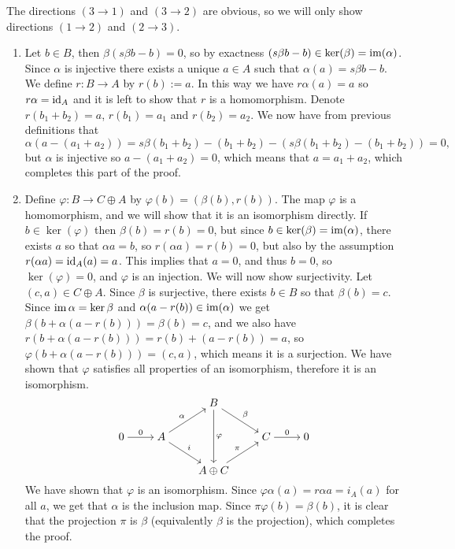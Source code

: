 \documentclass[11pt,a4paper]{article}
\begin{document}
\begin{solution}
  The directions $(3 \to 1)$ and $(3 \to 2)$ are obvious,
  so we will only show directions $(1 \to 2)$ and $(2 \to 3)$.
  \begin{enumerate}
    \item[$(1 \to 2)$] Let $b \in B$, then $\beta(s\beta b - b) = 0$,
      so by exactness $(s\beta b - b) \in \ker(\beta) = \operatorname{im}(\alpha)$.
      Since $\alpha$ is injective there exists a unique $a \in A$
      such that $\alpha(a) = s\beta b - b$.
      We define $r \colon B \to A$ by $r(b) := a$.
      In this way we have $r\alpha(a) = a$ so $r\alpha = \operatorname{id}_A$
      and it is left to show that $r$ is a homomorphism.
      Denote $r(b_1 + b_2) = a$, $r(b_1) = a_1$ and $r(b_2) = a_2$.
      We now have from previous definitions that
      \[
        \alpha(a - (a_1 + a_2)) =
        s\beta (b_1 + b_2) - (b_1 + b_2) -
        (s\beta (b_1 + b_2) - (b_1 + b_2)) = 0,
      \]
      but $\alpha$ is injective so $a - (a_1 + a_2) = 0$,
      which means that $a = a_1 + a_2$, which completes this part of the proof.
    \item[$(2 \to 3)$] Define $\varphi \colon B \to C \oplus A$ by
      $\varphi(b) = (\beta(b),r(b))$.
      The map $\varphi$ is a homomorphism, and we will show that it is
      an isomorphism directly.
      If $b \in \ker(\varphi)$ then $\beta(b) = r(b) = 0$,
      but since $b \in \ker(\beta) = \operatorname{im}(\alpha)$,
      there exists $a$ so that $\alpha a = b$,
      so $r(\alpha a) = r(b) = 0$,
      but also by the assumption $r(\alpha a) = \operatorname{id}_A(a) = a$.
      This implies that $a = 0$, and thus $b = 0$,
      so $\ker(\varphi) = 0$, and $\varphi$ is an injection.
      We will now show surjectivity.
      Let $(c,a) \in C \oplus A$.
      Since $\beta$ is surjective, there exists $b \in B$ so that
      $\beta(b) = c$.
      Since $\operatorname{im} \alpha = \ker \beta$
      and $\alpha(a - r(b)) \in \operatorname{im}(\alpha)$
      we get $\beta(b + \alpha(a - r(b))) = \beta(b) = c$,
      and we also have
      $r(b + \alpha(a - r(b))) = r(b) + (a - r(b)) = a$,
      so $\varphi(b + \alpha(a - r(b))) = (c,a)$,
      which means it is a surjection.
      We have shown that $\varphi$ satisfies all properties of an isomorphism,
      therefore it is an isomorphism.
      \[\begin{tikzcd}[ampersand replacement=\&,cramped]
      \&\& B \\
      0 \& A \&\& C \& 0 \\
      \&\& {A \oplus C}
      \arrow["\beta", from=1-3, to=2-4]
      \arrow["\varphi", from=1-3, to=3-3]
      \arrow["0", from=2-1, to=2-2]
      \arrow["\alpha", from=2-2, to=1-3]
      \arrow["i", from=2-2, to=3-3]
      \arrow["0", from=2-4, to=2-5]
      \arrow["\pi", from=3-3, to=2-4]
    \end{tikzcd}\]
    We have shown that $\varphi$ is an isomorphism.
    Since $\varphi \alpha(a) = r \alpha a = i_A(a)$ for all $a$,
    we get that $\alpha$ is the inclusion map.
    Since $\pi \varphi(b) = \beta(b)$, it is clear that the projection $\pi$
    is $\beta$ (equivalently $\beta$ is the projection),
    which completes the proof.
  \end{enumerate}
\end{solution}
\end{document}
